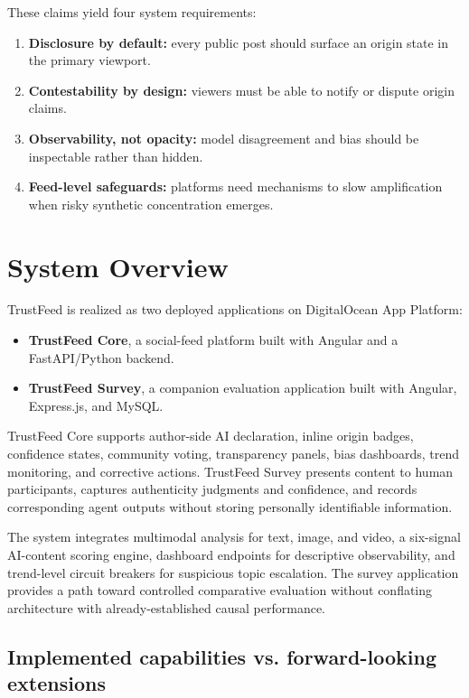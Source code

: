 \documentclass[acmlarge,screen,nonacm]{acmart}
\begin{document}
These claims yield four system requirements:
\begin{enumerate}[leftmargin=1.5em]
    \item \textbf{Disclosure by default:} every public post should surface an origin state in the primary viewport.
    \item \textbf{Contestability by design:} viewers must be able to notify or dispute origin claims.
    \item \textbf{Observability, not opacity:} model disagreement and bias should be inspectable rather than hidden.
    \item \textbf{Feed-level safeguards:} platforms need mechanisms to slow amplification when risky synthetic concentration emerges.
\end{enumerate}

\section{System Overview}

TrustFeed is realized as two deployed applications on DigitalOcean App Platform:
\begin{itemize}[leftmargin=1.5em]
    \item \textbf{TrustFeed Core}, a social-feed platform built with Angular and a FastAPI/Python backend.
    \item \textbf{TrustFeed Survey}, a companion evaluation application built with Angular, Express.js, and MySQL.
\end{itemize}

TrustFeed Core supports author-side AI declaration, inline origin badges, confidence states, community voting, transparency panels, bias dashboards, trend monitoring, and corrective actions. TrustFeed Survey presents content to human participants, captures authenticity judgments and confidence, and records corresponding agent outputs without storing personally identifiable information.

The system integrates multimodal analysis for text, image, and video, a six-signal AI-content scoring engine, dashboard endpoints for descriptive observability, and trend-level circuit breakers for suspicious topic escalation. The survey application provides a path toward controlled comparative evaluation without conflating architecture with already-established causal performance.

\subsection{Implemented capabilities vs. forward-looking extensions}
\end{document}
